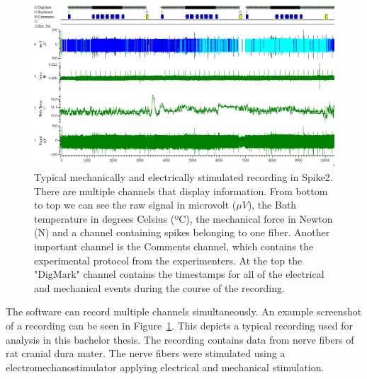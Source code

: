 \begin{figure}
	\includegraphics[width = \textwidth]{src/pic/Spike2_screenshot}
	\caption{Typical mechanically and electrically stimulated recording in Spike2. There are multiple channels that display information. From bottom to top we can see the raw signal in microvolt ($\mu V$), the Bath temperature in degrees Celsius (ºC), the mechanical force in Newton (N) and a channel containing spikes belonging to one fiber. Another important channel is the Comments channel, which contains the experimental protocol from the experimenters. At the top the "DigMark" channel contains the timestamps for all of the electrical and mechanical events during the course of the recording.}
	\label{fig:spike2}
\end{figure}
The software can record multiple channels simultaneously. An example screenshot of a recording can be seen in Figure~\ref{fig:spike2}. This depicts a typical recording used for analysis in this bachelor thesis. The recording contains data from nerve fibers of rat cranial dura mater. The nerve fibers were stimulated using a electromechanostimulator applying electrical and mechanical stimulation. 

